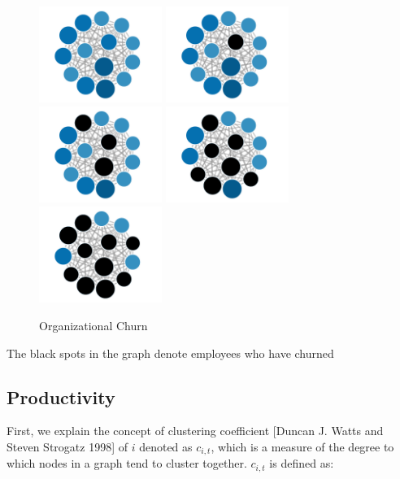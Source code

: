 \documentclass[12pt,a4paper,titlepage]{article}
\begin{document}
\begin{figure}[htb]
  \centering
  \includegraphics[width=4cm]{Pic3_0.png}
  \includegraphics[width=4cm]{Pic3_1.png}
  \includegraphics[width=4cm]{Pic3_2.png}
  \includegraphics[width=4cm]{Pic3_3.png}
  \includegraphics[width=4cm]{Pic3_4.png}
  \caption{Organizational Churn}\label{organizational-churn}
\end{figure}

The black spots in the graph denote employees who have churned

\subsection{Productivity}

First, we explain the concept of clustering coefficient [Duncan
J. Watts and Steven Strogatz 1998] of $i$ denoted as $c_{i,t}$, which
is a measure of the degree to which nodes in a graph tend to cluster
together. $c_{i,t}$ is defined as:
\end{document}
